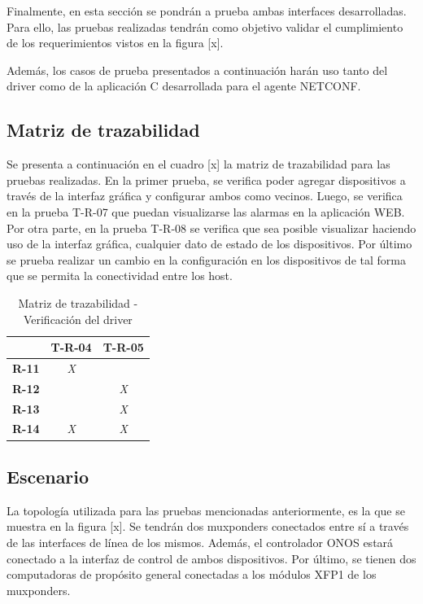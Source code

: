 Finalmente, en esta sección se pondrán a prueba ambas interfaces desarrolladas. Para ello, las pruebas realizadas tendrán como objetivo validar el cumplimiento de los requerimientos vistos en la figura [x]. 

Además, los casos de prueba presentados a continuación harán uso tanto del driver como de la aplicación C desarrollada para el agente NETCONF.


\subsection{Matriz de trazabilidad}

Se presenta a continuación en el cuadro [x] la matriz de trazabilidad para las pruebas realizadas. 
En la primer prueba, se verifica poder agregar dispositivos a través de la interfaz gráfica y configurar ambos como vecinos. 
Luego, se verifica en la prueba T-R-07 que puedan visualizarse las alarmas en la aplicación WEB.
Por otra parte, en la prueba T-R-08 se verifica que sea posible visualizar haciendo uso de la interfaz gráfica, cualquier dato de estado de los dispositivos.
Por último se prueba realizar un cambio en la configuración en los dispositivos de tal forma que se permita la conectividad entre los host.



\begin{table}[!h]
    \centering
    \begin{tabular}{|c|c|c|}
        \hline
        \textbf{}     & \textbf{T-R-04} & \textbf{T-R-05} \\ \hline
        \textbf{R-11} & \textit{X}      & \textit{}       \\ \hline
        \textbf{R-12} & \textit{}       & \textit{X}      \\ \hline
        \textbf{R-13} & \textit{}       & \textit{X}      \\ \hline
        \textbf{R-14} & \textit{X}      & \textit{X}      \\ \hline
        \end{tabular}
    \caption{Matriz de trazabilidad - Verificación del driver}
    \label{tab:matriz_driver}
\end{table}

\subsection{Escenario}

La topología utilizada para las pruebas mencionadas anteriormente, es la que se muestra en la figura [x]. 
Se tendrán dos muxponders conectados entre sí a través de las interfaces de línea de los mismos. Además, el controlador ONOS estará conectado a la interfaz de control de ambos dispositivos. Por último, se tienen dos computadoras de propósito general conectadas a los módulos XFP1 de los muxponders.



